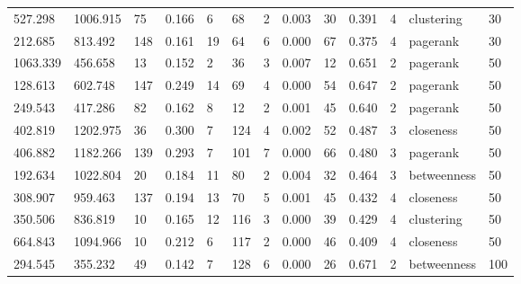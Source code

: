 \documentclass[sn-mathphys-num]{sn-jnl}
\begin{document}
\begin{table}
\begin{tabularx}{\textwidth}{@{}XXXXXXXXXXXll@{}}
        527.298  & 1006.915  & 75       & 0.166     & 6          & 68          & 2           & 0.003 & 30         & 0.391    & 4         & clustering       & 30        \\
        212.685  & 813.492   & 148      & 0.161     & 19         & 64          & 6           & 0.000 & 67         & 0.375    & 4         & pagerank         & 30        \\
        \midrule
        1063.339 & 456.658   & 13       & 0.152     & 2          & 36          & 3           & 0.007 & 12         & 0.651    & 2         & pagerank         & 50        \\
        128.613  & 602.748   & 147      & 0.249     & 14         & 69          & 4           & 0.000 & 54         & 0.647    & 2         & pagerank         & 50        \\
        249.543  & 417.286   & 82       & 0.162     & 8          & 12          & 2           & 0.001 & 45         & 0.640    & 2         & pagerank         & 50        \\
        \midrule
        402.819  & 1202.975  & 36       & 0.300     & 7          & 124         & 4           & 0.002 & 52         & 0.487    & 3         & closeness        & 50        \\
        406.882  & 1182.266  & 139      & 0.293     & 7          & 101         & 7           & 0.000 & 66         & 0.480    & 3         & pagerank         & 50        \\
        192.634  & 1022.804  & 20       & 0.184     & 11         & 80          & 2           & 0.004 & 32         & 0.464    & 3         & betweenness      & 50        \\
        \midrule
        308.907  & 959.463   & 137      & 0.194     & 13         & 70          & 5           & 0.001 & 45         & 0.432    & 4         & closeness        & 50        \\
        350.506  & 836.819   & 10       & 0.165     & 12         & 116         & 3           & 0.000 & 39         & 0.429    & 4         & clustering       & 50        \\
        664.843  & 1094.966  & 10       & 0.212     & 6          & 117         & 2           & 0.000 & 46         & 0.409    & 4         & closeness        & 50        \\
        \midrule
        294.545  & 355.232   & 49       & 0.142     & 7          & 128         & 6           & 0.000 & 26         & 0.671    & 2         & betweenness      & 100       \\

\end{tabularx}
\end{table}
\end{document}
